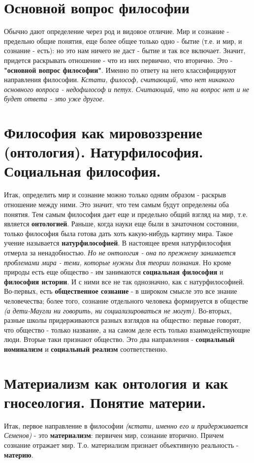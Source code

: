 \section{Основной вопрос философии}
Обычно дают определение через род и видовое отличие. Мир и сознание - предельно общие понятия, еще более общее только одно - бытие (т.е. и мир, и сознание - есть): но это нам ничего не даст - бытие и так все включает. Значит, придется раскрывать отношение - что из них первично, что вторично. Это - \textbf{"основной вопрос философии"}. Именно по ответу на него классифицируют направления философии. \textit{Кстати, философ, считающий, что нет никакого основного вопроса - недофилософ и петух. Считающий, что на вопрос нет и не будет ответа - это уже другое.}

\section{Философия как мировоззрение (онтология). Натурфилософия. Социальная философия.}
Итак, определить мир и сознание можно только одним образом - раскрыв отношение между ними. Это значит, что тем самым будут определены оба понятия. Тем самым философия дает еще и предельно общий взгляд на мир, т.е. является \textbf{онтологией}. Раньше, когда науки еще были в зачаточном состоянии, только философия была готова дать хоть какую-нибудь картину мира. Такое учение называется \textbf{натурфилософией}. В настоящее время натурфилософия отмерла за ненадобностью. \textit{Но не онтология - она по прежнему занимается проблемами мира - теми, которые нужны для теории познания}. Но кроме природы есть еще общество - им занимаются \textbf{социальная философия} и \textbf{философия истории}. И с ними все не так однозначно, как с натурфилософией. Во-первых, есть \textbf{общественное сознание} - в широком смысле это все знание человечества; более того, сознание отдельного человека формируется в обществе \textit{(а дети-Маугли ни говорить, ни социализироваться не могут)}. Во-вторых, разные школы придерживаются разных взглядов на общество: первые говорят, что общество - только название, а на самом деле есть только взаимодействующие люди. Вторые таки признают общество. Это два направления - \textbf{социальный номинализм} и \textbf{социальный реализм} соответственно.

\section{Материализм как онтология и как гносеология. Понятие материи.}
Итак, первое направление в философии \textit{(кстати, именно его и придерживается Семенов)} - это \textbf{материализм}: первичен мир, сознание вторично. Причем сознание отражает мир. Т.о. материализм признает объективную реальность - \textbf{материю}. 

